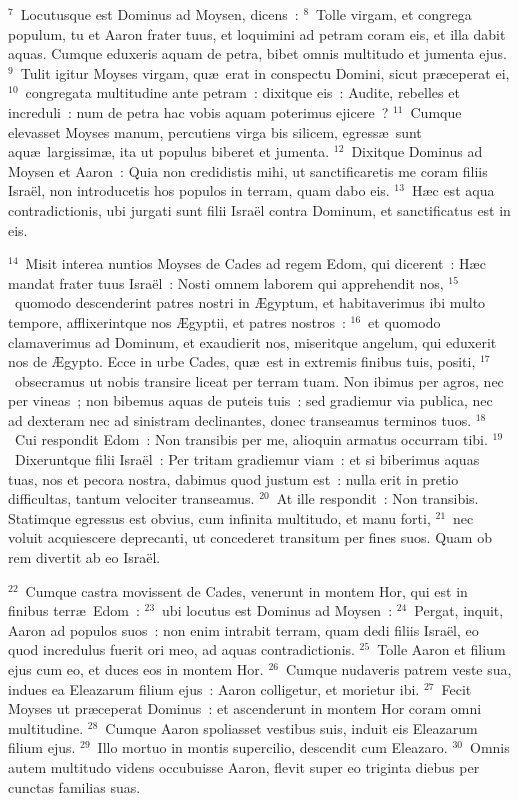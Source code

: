 ${}^{7}$~Locutusque est Dominus ad Moysen, dicens~:
${}^{8}$~Tolle virgam, et congrega populum, tu et Aaron frater tuus, et loquimini ad petram coram eis, et illa dabit aquas. Cumque eduxeris aquam de petra, bibet omnis multitudo et jumenta ejus.
${}^{9}$~Tulit igitur Moyses virgam, qu\ae\ erat in conspectu Domini, sicut pr\ae ceperat ei,
${}^{10}$~congregata multitudine ante petram~: dixitque eis~: Audite, rebelles et increduli~: num de petra hac vobis aquam poterimus ejicere~?
${}^{11}$~Cumque elevasset Moyses manum, percutiens virga bis silicem, egress\ae\ sunt aqu\ae\ largissim\ae , ita ut populus biberet et jumenta.
${}^{12}$~Dixitque Dominus ad Moysen et Aaron~: Quia non credidistis mihi, ut sanctificaretis me coram filiis Isra\"el, non introducetis hos populos in terram, quam dabo eis.
${}^{13}$~H\ae c est aqua contradictionis, ubi jurgati sunt filii Isra\"el contra Dominum, et sanctificatus est in eis.


${}^{14}$~Misit interea nuntios Moyses de Cades ad regem Edom, qui dicerent~: H\ae c mandat frater tuus Isra\"el~: Nosti omnem laborem qui apprehendit nos,
${}^{15}$~quomodo descenderint patres nostri in \AE gyptum, et habitaverimus ibi multo tempore, afflixerintque nos \AE gyptii, et patres nostros~:
${}^{16}$~et quomodo clamaverimus ad Dominum, et exaudierit nos, miseritque angelum, qui eduxerit nos de \AE gypto. Ecce in urbe Cades, qu\ae\ est in extremis finibus tuis, positi,
${}^{17}$~obsecramus ut nobis transire liceat per terram tuam. Non ibimus per agros, nec per vineas~; non bibemus aquas de puteis tuis~: sed gradiemur via publica, nec ad dexteram nec ad sinistram declinantes, donec transeamus terminos tuos.
${}^{18}$~Cui respondit Edom~: Non transibis per me, alioquin armatus occurram tibi.
${}^{19}$~Dixeruntque filii Isra\"el~: Per tritam gradiemur viam~: et si biberimus aquas tuas, nos et pecora nostra, dabimus quod justum est~: nulla erit in pretio difficultas, tantum velociter transeamus.
${}^{20}$~At ille respondit~: Non transibis. Statimque egressus est obvius, cum infinita multitudo, et manu forti,
${}^{21}$~nec voluit acquiescere deprecanti, ut concederet transitum per fines suos. Quam ob rem divertit ab eo Isra\"el.


${}^{22}$~Cumque castra movissent de Cades, venerunt in montem Hor, qui est in finibus terr\ae\ Edom~:
${}^{23}$~ubi locutus est Dominus ad Moysen~:
${}^{24}$~Pergat, inquit, Aaron ad populos suos~: non enim intrabit terram, quam dedi filiis Isra\"el, eo quod incredulus fuerit ori meo, ad aquas contradictionis.
${}^{25}$~Tolle Aaron et filium ejus cum eo, et duces eos in montem Hor.
${}^{26}$~Cumque nudaveris patrem veste sua, indues ea Eleazarum filium ejus~: Aaron colligetur, et morietur ibi.
${}^{27}$~Fecit Moyses ut pr\ae ceperat Dominus~: et ascenderunt in montem Hor coram omni multitudine.
${}^{28}$~Cumque Aaron spoliasset vestibus suis, induit eis Eleazarum filium ejus.
${}^{29}$~Illo mortuo in montis supercilio, descendit cum Eleazaro.
${}^{30}$~Omnis autem multitudo videns occubuisse Aaron, flevit super eo triginta diebus per cunctas familias suas.

